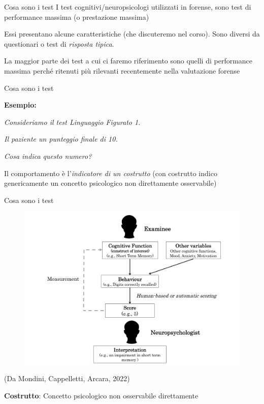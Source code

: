 \documentclass[
  ignorenonframetext,
]{beamer}
\begin{document}
\begin{frame}{Cosa sono i test}
\label{cosa-sono-i-test}
I test cognitivi/neuropsicologi utilizzati in forense, sono test di
performance massima (o prestazione massima)

Essi presentano alcune caratteristiche (che discuteremo nel corso). Sono
diversi da questionari o test di \emph{risposta tipica}. \pause
\vspace{2em}

\begin{center}
La maggior parte dei test a cui ci faremo riferimento sono quelli di performance massima perché ritenuti più rilevanti recentemente nella valutazione forense
\end{center}
\end{frame}

\begin{frame}{Cosa sono i test}
\label{cosa-sono-i-test-1}
\begin{center}
  \textbf{Esempio:}
\end{center}
\vspace{2em}

\emph{Consideriamo il test Linguaggio Figurato 1.}

\emph{Il paziente un punteggio finale di 10.}

\emph{Cosa indica questo numero?} \pause \vspace{2em}

Il comportamento è l'\emph{indicatore di un costrutto} (con costrutto
indico genericamente un concetto psicologico non direttamente
osservabile)
\end{frame}

\begin{frame}{Cosa sono i test}
\label{cosa-sono-i-test-2}
\begin{figure}
  \includegraphics[scale=0.3]{Figures/measurement_diagramma.png}
\end{figure}

\begin{flushright}
  (Da Mondini, Cappelletti, Arcara, 2022)
\end{flushright}

\textbf{Costrutto}: Concetto psicologico non osservabile direttamente
\end{frame}
\end{document}

